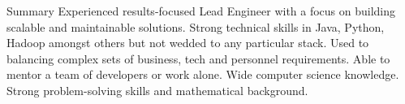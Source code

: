 \documentclass{resume} %
\begin{document}

\begin{rSection}{Summary}
Experienced results-focused Lead Engineer with a focus on building scalable and maintainable solutions. Strong technical skills in Java, Python, Hadoop amongst others but not wedded to any particular stack. Used to balancing complex sets of business, tech and personnel requirements. Able to mentor a team of developers or work alone. Wide computer science knowledge. Strong problem-solving skills and mathematical background.
\end{rSection}

\end{document}

